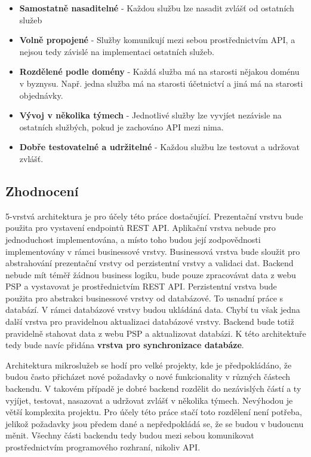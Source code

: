\begin{itemize}
	\item \textbf{Samostatně nasaditelné} - Každou službu lze nasadit zvlášť od ostatních služeb

	\item \textbf{Volně propojené} - Služby komunikují mezi sebou prostřednictvím API, a nejsou tedy závislé na implementaci ostatních služeb.
	
	\item \textbf{Rozdělené podle domény} - Každá služba má na starosti nějakou doménu v byznysu. \linebreak Např. jedna služba má na starosti účetnictví a jiná má na starosti objednávky.
	
	\item \textbf{Vývoj v několika týmech} - Jednotlivé služby lze vyvjíet nezávisle na ostatních \linebreak službých, pokud je zachováno API mezi nima.
	
	\item \textbf{Dobře testovatelné a udržitelné} - Každou službu lze testovat a udržovat zvlášť.
\end{itemize}

\subsection{Zhodnocení}
5-vrstvá architektura je pro účely této práce dostačující. Prezentační vrstvu bude použita pro vystavení endpointů REST API. Aplikační vrstva nebude pro jednoduchost \linebreak implementována, a místo toho budou její zodpovědnosti implementovány v rámci businessové vrstvy. Businessová vrstva bude sloužit pro abstrahování prezentační vrstvy od perzistentní vrstvy a validaci dat. Backend nebude mít téměř žádnou business logiku, bude pouze zpracovávat data z webu PSP a vystavovat je prostřednictvím REST API. Perzistentní vrstva bude použita pro abstrakci businessové vrstvy od databázové. To usnadní práce s databází. V rámci databázové vrstvy budou ukládáná data. Chybí tu však jedna další vrstva pro pravidelnou aktualizaci databázové vrstvy. Backend bude totiž pravidelně stahovat data z webu PSP a aktualizovat databázi. K této architektuře tedy bude navíc přidána \textbf{vrstva pro synchronizace databáze}.

Architektura mikroslužeb se hodí pro velké projekty, kde je předpokládáno, že budou často přicházet nové požadavky o nové funkcionality v různých částech backendu. V takovém případě je dobré backend rozdělit do nezávislých částí a ty vyjíjet, testovat, nasazovat a udržovat zvlášť v několika týmech. Nevýhodou je větší komplexita projektu. Pro účely této práce stačí toto rozdělení není potřeba, jelikož požadavky jsou předem dané a nepředpokládá se, že se budou \linebreak v budoucnu měnit. Všechny části backendu tedy budou mezi sebou komunikovat prostřednictvím programového rozhraní, nikoliv API.


